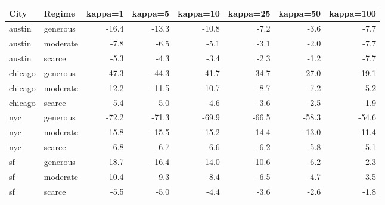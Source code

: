 \begin{tabular}{llrrrrrr}
\toprule
City & Regime & kappa=1 & kappa=5 & kappa=10 & kappa=25 & kappa=50 & kappa=100 \\
\midrule
austin & generous & -16.4 & -13.3 & -10.8 & -7.2 & -3.6 & -7.7 \\
austin & moderate & -7.8 & -6.5 & -5.1 & -3.1 & -2.0 & -7.7 \\
austin & scarce & -5.3 & -4.3 & -3.4 & -2.3 & -1.2 & -7.7 \\
chicago & generous & -47.3 & -44.3 & -41.7 & -34.7 & -27.0 & -19.1 \\
chicago & moderate & -12.2 & -11.5 & -10.7 & -8.7 & -7.2 & -5.2 \\
chicago & scarce & -5.4 & -5.0 & -4.6 & -3.6 & -2.5 & -1.9 \\
nyc & generous & -72.2 & -71.3 & -69.9 & -66.5 & -58.3 & -54.6 \\
nyc & moderate & -15.8 & -15.5 & -15.2 & -14.4 & -13.0 & -11.4 \\
nyc & scarce & -6.8 & -6.7 & -6.6 & -6.2 & -5.8 & -5.1 \\
sf & generous & -18.7 & -16.4 & -14.0 & -10.6 & -6.2 & -2.3 \\
sf & moderate & -10.4 & -9.3 & -8.4 & -6.5 & -4.7 & -3.5 \\
sf & scarce & -5.5 & -5.0 & -4.4 & -3.6 & -2.6 & -1.8 \\
\bottomrule
\end{tabular}
